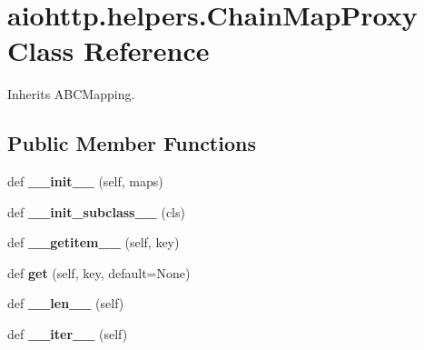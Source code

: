 \hypertarget{classaiohttp_1_1helpers_1_1_chain_map_proxy}{}\section{aiohttp.\+helpers.\+Chain\+Map\+Proxy Class Reference}
\label{classaiohttp_1_1helpers_1_1_chain_map_proxy}


Inherits A\+B\+C\+Mapping.

\subsection*{Public Member Functions}
\begin{DoxyCompactItemize}
\item 
\mbox{\label{classaiohttp_1_1helpers_1_1_chain_map_proxy_ac3fae981be49e8cd0fbd49616801f763}} 
def {\bfseries \+\_\+\+\_\+init\+\_\+\+\_\+} (self, maps)
\item 
\mbox{\label{classaiohttp_1_1helpers_1_1_chain_map_proxy_adf17ea111dada85a685ed7ca739c82fb}} 
def {\bfseries \+\_\+\+\_\+init\+\_\+subclass\+\_\+\+\_\+} (cls)
\item 
\mbox{\label{classaiohttp_1_1helpers_1_1_chain_map_proxy_aa3f4b405145d38b2e7b81233b86aafcc}} 
def {\bfseries \+\_\+\+\_\+getitem\+\_\+\+\_\+} (self, key)
\item 
\mbox{\label{classaiohttp_1_1helpers_1_1_chain_map_proxy_a1639e8cb840ec367868acb708d04d6cd}} 
def {\bfseries get} (self, key, default=None)
\item 
\mbox{\label{classaiohttp_1_1helpers_1_1_chain_map_proxy_a250771e06c2e1a5d91aac773f1d97163}} 
def {\bfseries \+\_\+\+\_\+len\+\_\+\+\_\+} (self)
\item 
\mbox{\label{classaiohttp_1_1helpers_1_1_chain_map_proxy_afadd6f749f73ac995d0fed6bd990cff4}} 
def {\bfseries \+\_\+\+\_\+iter\+\_\+\+\_\+} (self)
\item 
\mbox{\label{classaiohttp_1_1helpers_1_1_chain_map_proxy_a45e21231160455a16e6df4962c9da1f4}} 

\end{DoxyCompactItemize}
